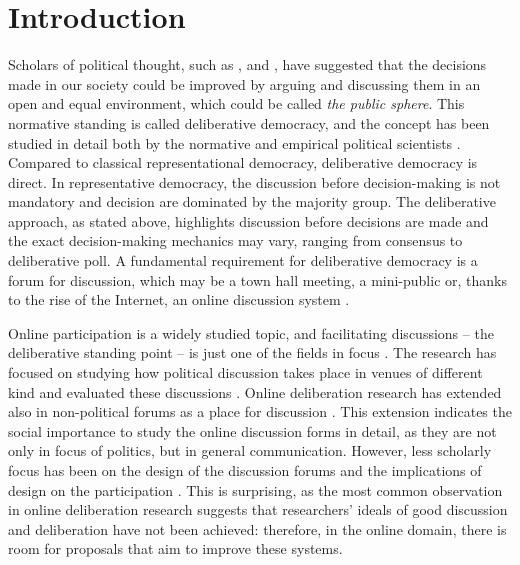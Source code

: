 \documentclass{article}
\begin{document}
\newpage

\section{Introduction}

Scholars of political thought, such as ,  and , have suggested that the decisions made in our society could be improved by arguing and discussing them in an open and equal environment, which could be called \textit{the public sphere}. This normative standing is called deliberative democracy, and the concept has been studied in detail both by the normative and empirical political scientists . Compared to classical representational democracy, deliberative democracy is direct. In representative democracy, the discussion before decision-making is not mandatory and decision are dominated by the majority group. The deliberative approach, as stated above, highlights discussion before decisions are made and the exact decision-making mechanics may vary, ranging from consensus to deliberative poll. A fundamental requirement for deliberative democracy is a forum for discussion, which may be a town hall meeting, a mini-public or, thanks to the rise of the Internet, an online discussion system .

Online participation is a widely studied topic, and facilitating discussions -- the deliberative standing point -- is just one of the fields in focus . The research has focused on studying how political discussion takes place in venues of different kind  and evaluated these discussions . Online deliberation research has extended also in non-political forums as a place for discussion \cite{graham12}. This extension indicates the social importance to study the online discussion forms in detail, as they are not only in focus of politics, but in general communication. However, less scholarly focus has been on the design of the discussion forums and the implications of design on the participation . This is surprising, as the most common observation in online deliberation research suggests that researchers' ideals of good discussion and deliberation have not been achieved: therefore, in the online domain, there is room for proposals that aim to improve these systems.
\end{document}
